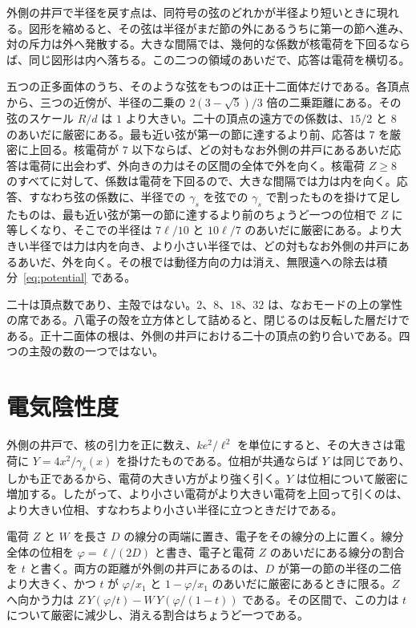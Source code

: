 \documentclass[a4paper]{article}
\begin{document}
外側の井戸で半径を戻す点は、同符号の弦のどれかが半径より短いときに現れる。図形を縮めると、その弦は半径がまだ節の外にあるうちに第一の節へ進み、対の斥力は外へ発散する。大きな間隔では、幾何的な係数が核電荷を下回るならば、同じ図形は内へ落ちる。この二つの領域のあいだで、応答は電荷を横切る。

五つの正多面体のうち、そのような弦をもつのは正十二面体だけである。各頂点から、三つの近傍が、半径の二乗の \(2(3-\sqrt{5})/3\) 倍の二乗距離にある。その弦のスケール \(R/d\) は \(1\) より大きい。二十の頂点の遠方での係数は、\(15/2\) と \(8\) のあいだに厳密にある。最も近い弦が第一の節に達するより前、応答は \(7\) を厳密に上回る。核電荷が \(7\) 以下ならば、どの対もなお外側の井戸にあるあいだ応答は電荷に出会わず、外向きの力はその区間の全体で外を向く。核電荷 \(Z\ge 8\) のすべてに対して、係数は電荷を下回るので、大きな間隔では力は内を向く。応答、すなわち弦の係数に、半径での \(\gamma_s\) を弦での \(\gamma_s\) で割ったものを掛けて足したものは、最も近い弦が第一の節に達するより前のちょうど一つの位相で \(Z\) に等しくなり、そこでの半径は \(7\ell/10\) と \(10\ell/7\) のあいだに厳密にある。より大きい半径では力は内を向き、より小さい半径では、どの対もなお外側の井戸にあるあいだ、外を向く。その根では動径方向の力は消え、無限遠への除去は積分~\eqref{eq:potential} である。

二十は頂点数であり、主殻ではない。\(2\)、\(8\)、\(18\)、\(32\) は、なおモードの上の掌性の席である。八電子の殻を立方体として詰めると、閉じるのは反転した層だけである。正十二面体の根は、外側の井戸における二十の頂点の釣り合いである。四つの主殻の数の一つではない。

\section{電気陰性度}
\label{sec:eneg}

外側の井戸で、核の引力を正に数え、\(k e^{2}/\ell^{2}\) を単位にすると、その大きさは電荷に \(Y=4x^{2}/\gamma_s(x)\) を掛けたものである。位相が共通ならば \(Y\) は同じであり、しかも正であるから、電荷の大きい方がより強く引く。\(Y\) は位相について厳密に増加する。したがって、より小さい電荷がより大きい電荷を上回って引くのは、より大きい位相、すなわちより小さい半径に立つときだけである。

電荷 \(Z\) と \(W\) を長さ \(D\) の線分の両端に置き、電子をその線分の上に置く。線分全体の位相を \(\varphi=\ell/(2D)\) と書き、電子と電荷 \(Z\) のあいだにある線分の割合を \(t\) と書く。両方の距離が外側の井戸にあるのは、\(D\) が第一の節の半径の二倍より大きく、かつ \(t\) が \(\varphi/x_1\) と \(1-\varphi/x_1\) のあいだに厳密にあるときに限る。\(Z\) へ向かう力は \(Z\,Y(\varphi/t)-W\,Y(\varphi/(1-t))\) である。その区間で、この力は \(t\) について厳密に減少し、消える割合はちょうど一つである。
\end{document}
